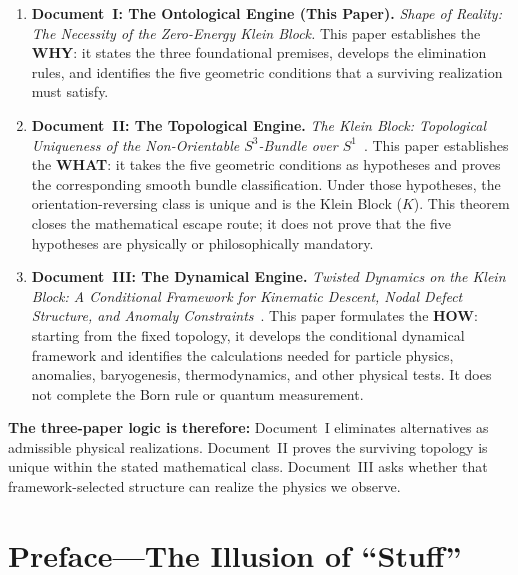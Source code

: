 \documentclass[11pt]{article}
\theoremstyle{canonstyle}
\providecommand{\Klein}{\mathcal{K}}
\def\mathcal#1{#1}%
\begin{document}
\begin{enumerate}
    \item \textbf{Document~I: The Ontological Engine (This Paper).} \textit{Shape of Reality: The Necessity of the Zero-Energy Klein Block.} This paper establishes the \textbf{WHY}: it states the three foundational premises, develops the elimination rules, and identifies the five geometric conditions that a surviving realization must satisfy.
    \item \textbf{Document~II: The Topological Engine.} \textit{The Klein Block: Topological Uniqueness of the Non-Orientable $S^3$-Bundle over $S^1$}~\cite{CanonWhat}. This paper establishes the \textbf{WHAT}: it takes the five geometric conditions as hypotheses and proves the corresponding smooth bundle classification. Under those hypotheses, the orientation-reversing class is unique and is the Klein Block ($\Klein$). This theorem closes the mathematical escape route; it does not prove that the five hypotheses are physically or philosophically mandatory.
    \item \textbf{Document~III: The Dynamical Engine.} \textit{Twisted Dynamics on the Klein Block: A Conditional Framework for Kinematic Descent, Nodal Defect Structure, and Anomaly Constraints}~\cite{CanonHow}. This paper formulates the \textbf{HOW}: starting from the fixed topology, it develops the conditional dynamical framework and identifies the calculations needed for particle physics, anomalies, baryogenesis, thermodynamics, and other physical tests. It does not complete the Born rule or quantum measurement.
\end{enumerate}

\begin{keyresult}
\textbf{The three-paper logic is therefore:} Document~I eliminates alternatives as admissible physical realizations. Document~II proves the surviving topology is unique within the stated mathematical class. Document~III asks whether that framework-selected structure can realize the physics we observe.
\end{keyresult}

\newpage
{}
\tableofcontents

\newpage
{}
\setcounter{page}{1}

\section*{Preface---The Illusion of ``Stuff''}
{}
\end{document}
